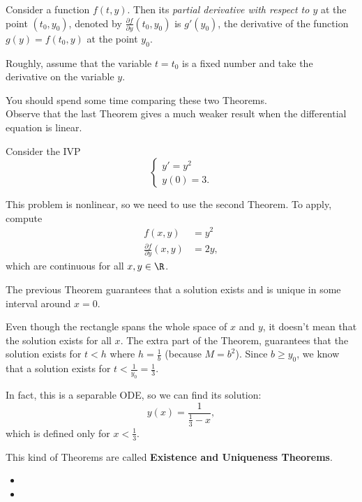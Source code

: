 \begin{definition}
	Consider a function $f(t,y)$. Then its \emph{partial derivative with respect to $y$} at the point $(t_0,y_0)$, denoted by $\frac{\partial f}{\partial y}(t_0,y_0)$ is $g'(y_0)$, the derivative of the function $g(y)=f(t_0,y)$ at the point $y_0$.
	
	Roughly, assume that the variable $t=t_0$ is a fixed number and take the derivative on the variable $y$.
\end{definition}


You should spend some time comparing these two Theorems. \\


Observe that the last Theorem gives a much weaker result when the differential equation is linear.


\begin{example}
Consider the IVP
$$
\begin{cases}
y'=y^2\\
y(0)=3.
\end{cases}
$$

This problem is nonlinear, so we need to use the second Theorem. To apply, compute
\begin{align*}
f(x,y) & = y^2 \\
\frac{\partial f}{\partial y}(x,y) & = 2y,
\end{align*}
which are continuous for all $x,y\in \R$.

The previous Theorem guarantees that a solution exists and is unique in some interval around $x=0$.

Even though the rectangle spans the whole space of $x$ and $y$, it doesn't mean that the solution exists for all $x$. The extra part of the Theorem, guarantees that the solution exists for $t<h$ where $h = \frac1b$ (because $M=b^2$). Since $b \geq y_0$, we know that a solution exists for $t < \frac{1}{y_0} = \frac13$.

In fact, this is a separable ODE, so we can find its solution:
$$
y(x) = \frac{1}{\frac13-x},
$$
which is defined only for $x<\frac13$.
\end{example}


\begin{graybox}
This kind of Theorems are called \textbf{\color{gray}Existence and Uniqueness Theorems}.
\end{graybox}



\begin{video}
\begin{itemize}
	\item {}
	\item {}
\end{itemize}	
\end{video}


